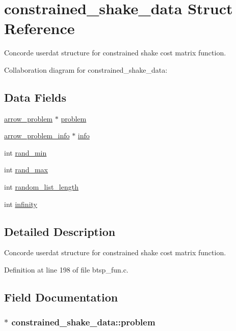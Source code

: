 \hypertarget{structconstrained__shake__data}{
\section{constrained\_\-shake\_\-data Struct Reference}
\label{structconstrained__shake__data}
}
Concorde userdat structure for constrained shake cost matrix function.  


Collaboration diagram for constrained\_\-shake\_\-data:\subsection*{Data Fields}
\begin{CompactItemize}
\item 
\hyperlink{structarrow__problem}{arrow\_\-problem} $\ast$ \hyperlink{structconstrained__shake__data_ae6de8c84cb5dc65aae992effa7c2763}{problem}
\item 
\hyperlink{structarrow__problem__info}{arrow\_\-problem\_\-info} $\ast$ \hyperlink{structconstrained__shake__data_d9b2d3116046f50437d023ac9bfcd51f}{info}
\item 
int \hyperlink{structconstrained__shake__data_76a13ad58e4ad8c74270ce8b05765ff9}{rand\_\-min}
\item 
int \hyperlink{structconstrained__shake__data_39972f2868c566a04f200957d9ad0c3f}{rand\_\-max}
\item 
int \hyperlink{structconstrained__shake__data_0114e4db38ea88cd199781d7ba97a44b}{random\_\-list\_\-length}
\item 
int \hyperlink{structconstrained__shake__data_ba0c33ec57d7f977911088e41b48c606}{infinity}
\end{CompactItemize}


\subsection{Detailed Description}
Concorde userdat structure for constrained shake cost matrix function. 

Definition at line 198 of file btsp\_\-fun.c.

\subsection{Field Documentation}
\hypertarget{structconstrained__shake__data_ae6de8c84cb5dc65aae992effa7c2763}{
\subsubsection{$\ast$ {\bf constrained\_\-shake\_\-data::problem}}}
\label{structconstrained__shake__data_ae6de8c84cb5dc65aae992effa7c2763}


